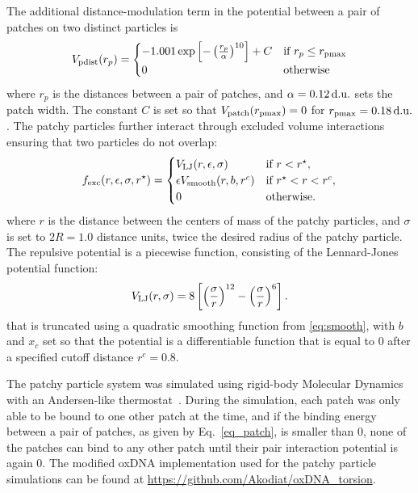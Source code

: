The additional distance-modulation term in the potential between a pair of patches on two distinct particles is 
\begin{equation}
    \label{eq_patch}
    V_{\rm pdist}(r_p) =  \begin{cases} 
                          -1.001  \exp{\left[- \left( \frac{r_p}{\alpha} \right)^{10}\right]} + C & \text{if $r_p \leq r_{\rm pmax}  $} \\
                          0 & \text{otherwise}
                        \end{cases}
\end{equation}
where $r_p$ is the distances between a pair of patches, and $\alpha = 0.12\, {\rm d.u.}$ sets the patch width. The constant $C$ is set so that $V_{\rm patch}(r_{\rm pmax}) = 0$ for $r_{\rm pmax} = 0.18\, \rm{d.u.}$. The patchy particles further interact through excluded volume interactions ensuring that two particles do not overlap:
\begin{equation}
    f_{\rm exc}(r,\epsilon,\sigma,r^{\star}) = \begin{cases}
	V_{\rm LJ}(r, \epsilon, \sigma) & \text{if $r < r^{\star} $},\\
	\epsilon V_{\rm smooth} (r, b, r^c) & \text{if $r^{\star} < r < r^c$},\\
	0 & \text{otherwise}.
	\end{cases} 
\end{equation}
where $r$ is the distance between the centers of mass of the patchy particles, and $\sigma$ is set to $2R = 1.0$ distance units, twice the desired radius of the patchy particle.
The repulsive potential is a piecewise function, consisting of the Lennard-Jones potential function:
\begin{equation} 
V_{\rm LJ}(r,  \sigma) = 8 \left[ \left(\frac{\sigma}{r}\right) ^{12} - \left(\frac{\sigma}{r}\right) ^{6} \right].
\end{equation}
that is truncated using a quadratic smoothing function from \eqref{eq:smooth}, with $b$ and $x_c$ set so that the potential is a differentiable function that is equal to $0$ after a specified cutoff distance $r^c = 0.8$.  

The patchy particle system was simulated using rigid-body Molecular Dynamics with an Andersen-like thermostat~\cite{russo2009reversible}. During the simulation, each patch was only able to be bound to one other patch at the time, and if the binding energy between a pair of patches, as given by Eq.~\eqref{eq_patch}, is smaller than 0, none of the patches can bind to any other patch until their pair interaction potential is again 0.
The modified oxDNA implementation used for the patchy particle simulations can be found at \href{https://github.com/Akodiat/oxDNA_torsion}{https://github.com/Akodiat/oxDNA\_torsion}.

